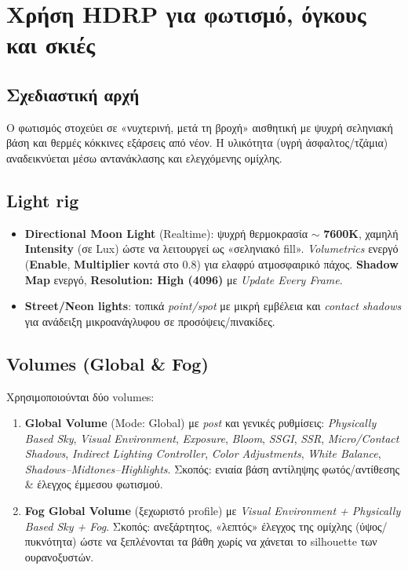 \section{Χρήση HDRP για φωτισμό, όγκους και σκιές}
\subsection*{Σχεδιαστική αρχή}
Ο φωτισμός στοχεύει σε «νυχτερινή, μετά τη βροχή» αισθητική με ψυχρή σεληνιακή βάση και θερμές κόκκινες εξάρσεις από νέον. Η υλικότητα (υγρή άσφαλτος/τζάμια) αναδεικνύεται μέσω αντανάκλασης και ελεγχόμενης ομίχλης.

\subsection*{Light rig}
\begin{itemize}
  \item \textbf{Directional Moon Light} (Realtime): ψυχρή θερμοκρασία \(\sim\) \textbf{7600K}, χαμηλή \textbf{Intensity} (σε Lux) ώστε να λειτουργεί ως «σεληνιακό fill». \textit{Volumetrics} ενεργό (\textbf{Enable}, \textbf{Multiplier} κοντά στο 0.8) για ελαφρύ ατμοσφαιρικό πάχος. \textbf{Shadow Map} ενεργό, \textbf{Resolution: High (4096)} με \textit{Update Every Frame}.
  \item \textbf{Street/Neon lights}: τοπικά \emph{point/spot} με μικρή εμβέλεια και \textit{contact shadows} για ανάδειξη μικροανάγλυφου σε προσόψεις/πινακίδες.
\end{itemize}

\subsection*{Volumes (Global \& Fog)}
Χρησιμοποιούνται δύο volumes:
\begin{enumerate}
  \item \textbf{Global Volume} (Mode: Global) με \emph{post} και γενικές ρυθμίσεις: \textit{Physically Based Sky}, \textit{Visual Environment}, \textit{Exposure}, \textit{Bloom}, \textit{SSGI}, \textit{SSR}, \textit{Micro/Contact Shadows}, \textit{Indirect Lighting Controller}, \textit{Color Adjustments}, \textit{White Balance}, \textit{Shadows–Midtones–Highlights}. Σκοπός: ενιαία βάση αντίληψης φωτός/αντίθεσης \& έλεγχος έμμεσου φωτισμού.
  \item \textbf{Fog Global Volume} (ξεχωριστό profile) με \textit{Visual Environment + Physically Based Sky + Fog}. Σκοπός: ανεξάρτητος, «λεπτός» έλεγχος της ομίχλης (ύψος/πυκνότητα) ώστε να ξεπλένονται τα βάθη χωρίς να χάνεται το silhouette των ουρανοξυστών.
\end{enumerate}

